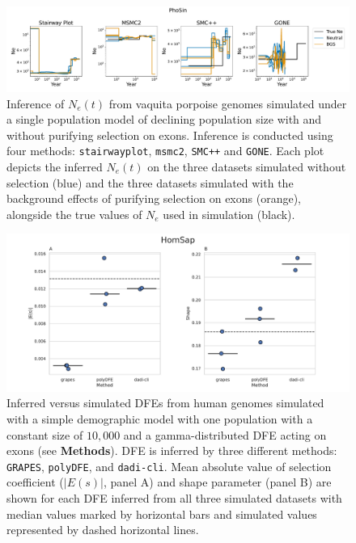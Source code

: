 \documentclass[hidelinks]{article}
\newcommand{\msmc}{\texttt{msmc2}\xspace}
\newcommand{\stairway}{\texttt{stairwayplot}\xspace}
\newcommand{\gone}{\texttt{GONE}\xspace}
\newcommand{\smcpp}{\texttt{SMC++}\xspace}
\newcommand{\polydfe}{\texttt{polyDFE}\xspace}
\newcommand{\dadicli}{\texttt{dadi-cli}\xspace}
\newcommand{\grapes}{\texttt{GRAPES}\xspace}
\begin{document}
\begin{figure}[h]
    \centering
    \includegraphics[width=\textwidth]{figures/PhoSin/Vaquita2Epoch_1R22/estimated_Ne_t_final.pdf}
    \caption{
    \label{fig:vaquita-demography}
    Inference of $N_e(t)$ from vaquita porpoise genomes simulated under a single population
    model of declining population size with and without purifying selection on exons.
    Inference is conducted using four methods: \stairway, \msmc, \smcpp and \gone.
    Each plot depicts the inferred $N_e(t)$ on the three datasets simulated without selection (blue)
    and the three datasets simulated with the background effects of purifying selection on exons (orange),
    alongside the true values of $N_e$ used in simulation (black).
}
\end{figure}


\begin{figure}[h]
    \centering
    \includegraphics[width=\textwidth]{figures/HomSap/Constant/HomSap_Constant_Gamma_K17_ensembl_havana_104_exons_DFE_plot}
    \caption{
       Inferred versus simulated DFEs from human genomes simulated with
       a simple demographic model with one population with a constant size of $10,000$
       and a gamma-distributed DFE acting on exons (see \textbf{Methods}).
        DFE is inferred by three different methods: \grapes, \polydfe , and \dadicli.
        Mean absolute value of selection coefficient ($\lvert E(s) \rvert$, panel A) and shape parameter (panel B)
        are shown for each DFE inferred from all three simulated datasets
        with median values marked by horizontal bars
        and simulated values represented by dashed horizontal lines.
    }
    \label{fig:homsap-dfe.constant}
\end{figure}
\end{document}

